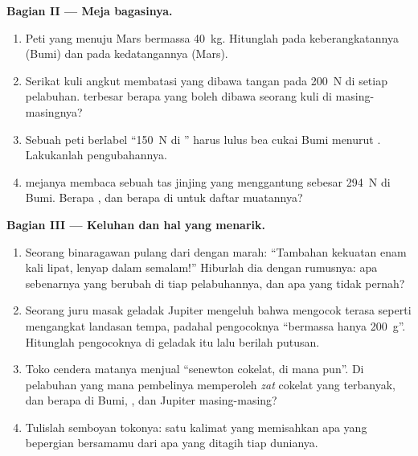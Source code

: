 \begin{problem}
\medskip\noindent\textbf{Bagian II --- Meja bagasinya.}
\begin{enumerate}[resume]
  \item Peti yang menuju Mars bermassa \qty{40}{kg}. Hitunglah
         pada keberangkatannya (Bumi) dan pada
        kedatangannya (Mars).
  \item Serikat kuli angkut membatasi \emph{} yang dibawa
        tangan pada \qty{200}{N} di setiap pelabuhan. \emph{}
        terbesar berapa yang boleh dibawa seorang kuli di
        masing-masingnya?
  \item Sebuah peti berlabel ``\qty{150}{N} di '' harus lulus
        bea cukai Bumi menurut . Lakukanlah pengubahannya.
  \item {} mejanya membaca sebuah tas jinjing yang
        menggantung sebesar \qty{294}{N} di Bumi. Berapa ,
        dan berapa  di  untuk daftar muatannya?
\end{enumerate}

\medskip\noindent\textbf{Bagian III --- Keluhan dan hal yang
menarik.}
\begin{enumerate}[resume]
  \item Seorang binaragawan pulang dari  dengan marah:
        ``Tambahan kekuatan enam kali lipat, lenyap dalam
        semalam!'' Hiburlah dia dengan rumusnya: apa sebenarnya yang
        berubah di tiap pelabuhannya, dan apa yang tidak pernah?
  \item Seorang juru masak geladak Jupiter mengeluh bahwa mengocok
        terasa seperti mengangkat landasan tempa, padahal
        pengocoknya ``bermassa hanya \qty{200}{g}''. Hitunglah 
        pengocoknya di geladak itu lalu berilah putusan.
  \item Toko cendera matanya menjual ``senewton cokelat, di mana
        pun''. Di pelabuhan yang mana pembelinya memperoleh
        \emph{zat} cokelat yang terbanyak, dan berapa  di
        Bumi, , dan Jupiter masing-masing?
  \item Tulislah semboyan tokonya: satu kalimat yang memisahkan apa
        yang bepergian bersamamu dari apa yang ditagih tiap dunianya.
\end{enumerate}
\end{problem}
